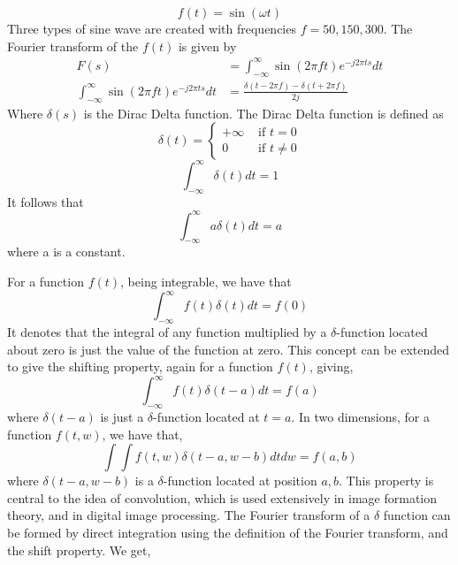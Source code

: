 \begin{equation}
f(t) = \sin(\omega t) 
\end{equation}
Three types of sine wave are created with frequencies ${f =50, 150,300}$. The Fourier transform of the $f(t)$ is given by
\begin{equation}
\begin{split}
F(s)  &= \int_{-\infty}^{\infty}{\sin(2\pi f t) e^{-j2\pi t s }dt} \\
 \int_{-\infty}^{\infty}{\sin(2\pi f t) e^{-j2\pi t s }dt}  &= \frac{\delta(t-2\pi f) - \delta(t+2\pi f)}{2j}
 \end{split}
\end{equation}
Where $\delta(s)$ is the Dirac Delta function. The Dirac Delta function is defined as
$$
\delta(t) = \left\{ \begin{array}{rl}
 +\infty  &\mbox{ if $t=0$} \\
   0 &\mbox{ if $t\ne0$}
          \end{array} \right.
		  $$
\begin{equation}
\int_{-\infty}^{\infty} \delta(t) dt = 1 
\end{equation}
It follows that
\begin{equation}
\int_{-\infty}^{\infty} a \delta(t) dt = a 
\end{equation}
where a is a constant. 

For a function $f(t)$, being integrable, we have that
\begin{equation}
\int_{-\infty}^{\infty}  f(t) \delta(t) dt = f(0)
\end{equation}
It denotes that the integral of any function multiplied by a $\delta$-function located about zero is just the value of the function at zero. This concept can be extended to give the shifting property, again for a function $f(t)$, giving, 
\begin{equation}
\int_{-\infty}^{\infty}  f(t) \delta(t-a) dt = f(a)
\end{equation}
where $\delta(t-a)$ is just a $\delta$-function located at $t = a$. 
In two dimensions, for a function $f(t,w)$, we have that,
\begin{equation}
\int\int  f(t,w) \delta(t-a,w-b) dt dw = f(a,b)
\end{equation}
where $\delta(t-a,w-b)$ is a $\delta$-function located at position $a,b$. This property is central to the idea of convolution, which is used extensively in image formation theory, and in digital image processing. 
The Fourier transform of a $\delta$ function can be formed by direct integration using the definition of the Fourier transform, and the shift property. We get, 

